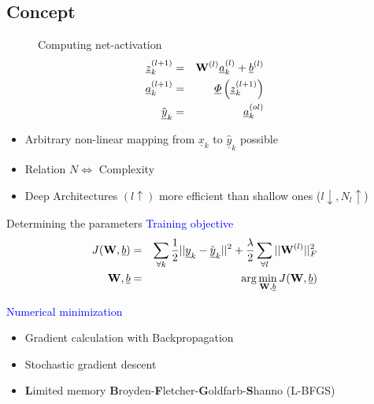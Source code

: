 	\subsection{Concept}		
		\begin{minipage}[t]{0.48\linewidth}
		\begin{figure}
			Computing net-activation
			\begin{eqnarray}
				\underline{z}^{(l+1)}_k &=& {\bf W}^{(l)}\underline{a}^{(l)}_k + \underline{b}^{(l)} \nonumber
\\
				\underline{a}^{(l+1)}_k &=& \underline{\Phi} \left ( \underline{z}^{(l+1)}_k \right )
\nonumber\\
				\hat{\underline{y}}_k &=& \underline{a}^{(ol)}_k \nonumber
			\end{eqnarray}
		\end{figure}
		\end{minipage}\hfill
		\begin{minipage}[t]{0.48\linewidth}
			\begin{itemize}
				\item Arbitrary non-linear mapping from $\underline{x}_k$ to  $\hat{\underline{y}}_k$ possible
				\item Relation $N \Leftrightarrow$ Complexity
				\item Deep Architectures $(l \uparrow)$ more efficient than shallow ones ($l\downarrow,
N_l\uparrow$)
			\end{itemize}
		\end{minipage}
		
	
	\begin{frame}[t]{Determining the parameters}
		\textcolor{blue}{\Large Training objective}
			\begin{eqnarray}
				J({\bf W}, \underline{b}) &=& \sum_{\forall k} \frac{1}{2} ||\underline{y}_k -
\hat{\underline{y}}_k||^2 + \frac{\lambda}{2} \sum_{\forall l} ||{\bf W}^{(l)}||_F^2 \\
				{\bf W}, \underline{b} &=& \arg \min_{{\bf W}, \underline{b}} J({\bf W}, \underline{b})
			\end{eqnarray}
			
		\textcolor{blue}{\Large Numerical minimization}		
		\begin{itemize}
			\item Gradient calculation with Backpropagation
			\item Stochastic gradient descent
			\item {\bf L}imited memory {\bf B}royden-{\bf F}letcher-{\bf G}oldfarb-{\bf S}hanno (L-BFGS)
		\end{itemize}	
	\end{frame}
	
